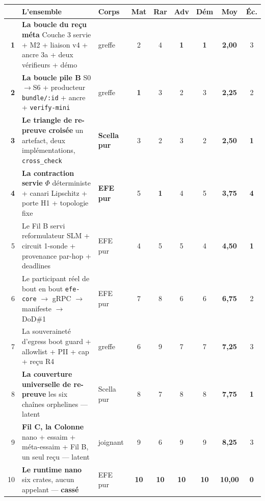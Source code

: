 \documentclass[10pt]{article}
\newcommand{\best}[1]{{\color{green}\textbf{#1}}}
\newcommand{\pire}[1]{{\color{red}\textbf{#1}}}
\newcommand{\sz}[1]{{\small\color{grey}\textsf{#1}}}
\newcommand{\code}[1]{\texttt{\small #1}}
\begin{document}
\renewcommand{\arraystretch}{1.16}
\begin{center}\small
\begin{tabular}{@{}r >{\raggedright\arraybackslash}p{6.75cm} l cccc c c@{}}
\toprule
& \textbf{L'ensemble} & \sz{Corps} & \sz{Mat} & \sz{Rar} & \sz{Adv} & \sz{Dém} & \textbf{Moy} & \sz{Éc.} \\
\midrule
\textbf{1} & \textbf{La boucle du reçu méta} \sz{Couche 3 servie + M2 + liaison v4 + ancre 3a + deux vérifieurs + démo} & \sz{greffe} & 2 & 4 & \best{1} & \best{1} & \textbf{2,00} & 3 \\
\textbf{2} & \textbf{La boucle pile B} \sz{S0$\rightarrow$S6 + producteur \code{bundle/:id} + ancre + \code{verify-mini}} & \sz{greffe} & \best{1} & 3 & 2 & 3 & \textbf{2,25} & 2 \\
\textbf{3} & \textbf{Le triangle de re-preuve croisée} \sz{un artefact, deux implémentations, \code{cross\_check}} & \sz{\textbf{Scella pur}} & 3 & 2 & 3 & 2 & \textbf{2,50} & \best{1} \\
\textbf{4} & \textbf{La contraction servie} \sz{$\Phi$ déterministe + canari Lipschitz + porte H1 + topologie fixe} & \sz{\textbf{EFE pur}} & 5 & \best{1} & 4 & 5 & \textbf{3,75} & \pire{4} \\
5 & Le Fil B servi \sz{reformulateur SLM + circuit 1-sonde + provenance par-hop + deadlines} & \sz{EFE pur} & 4 & 5 & 5 & 4 & \textbf{4,50} & \best{1} \\
6 & Le participant réel de bout en bout \sz{\code{efe-core} $\rightarrow$ gRPC $\rightarrow$ manifeste $\rightarrow$ DoD\#1} & \sz{EFE pur} & 7 & 8 & 6 & 6 & \textbf{6,75} & 2 \\
7 & La souveraineté d'egress \sz{boot guard + allowlist + PII + cap + reçu R4} & \sz{greffe} & 6 & 9 & 7 & 7 & \textbf{7,25} & 3 \\
8 & \textbf{La couverture universelle de re-preuve} \sz{les six chaînes orphelines --- latent} & \sz{Scella pur} & 8 & 7 & 8 & 8 & \textbf{7,75} & \best{1} \\
9 & \textbf{Fil C, la Colonne} \sz{nano + essaim + méta-essaim + Fil B, un seul reçu --- latent} & \sz{joignant} & 9 & 6 & 9 & 9 & \textbf{8,25} & 3 \\
10 & \textbf{Le runtime nano} \sz{six crates, aucun appelant --- \pire{cassé}} & \sz{EFE pur} & \pire{10} & \pire{10} & \pire{10} & \pire{10} & \textbf{10,00} & \best{0} \\
\bottomrule
\end{tabular}
\end{center}
\end{document}
